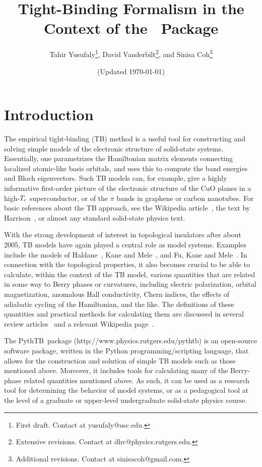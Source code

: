 \documentclass[11pt]{article}
\title{\Large Tight-Binding Formalism in the Context of the \PythTB\ Package}
\author{Tahir Yusufaly\footnote{First draft.  Contact at yusufaly@usc.edu.},
David Vanderbilt\footnote{Extensive revisions.  Contact at
dhv@physics.rutgers.edu.}, and
Sinisa Coh\footnote{Additional revisions.  Contact at
sinisacoh@gmail.com.}
}
\date{(Updated \today)}
\numberwithin{equation}{section} %
\def\PythTB{{\sc PythTB}}
\begin{document}
\maketitle

\section{Introduction}

The empirical tight-binding (TB) method is a useful tool for
constructing and solving simple models of the electronic structure
of solid-state systems.  Essentially, one parametrizes the
Hamiltonian matrix elements connecting localized atomic-like basis orbitals,
and uses this to compute the band energies and Bloch eigenvectors.
Such TB models can, for example, give a highly informative first-order
picture of the electronic structure of the CuO planes in a
high-$T_{\rm c}$ superconductor, or of the $\pi$ bands in
graphene or carbon nanotubes.  For basic references about the
TB approach, see the Wikipedia article~\cite{wiki-tb},
the text by Harrison~\cite{harrison-book},
or almost any standard solid-state physics text.

With the strong development of interest in topological insulators
after about 2005, TB models have again played a central role as
model systems.  Examples include the models of Haldane~\cite{haldane},
Kane and Mele~\cite{km}, and Fu, Kane and Mele~\cite{fkm}.
In connection with the topological properties, it also becomes
crucial to be able to calculate, within the context of the
TB model, various quantities that are related in some way to
Berry phases or curvatures, including electric polarization,
orbital magnetization, anomalous Hall conductivity, Chern
indices, the effects of adiabatic cycling of the Hamiltonian,
and the like.  The definitions of these quantities and practical
methods for calculating them are discussed in several review
articles~\cite{resta-rmp,vand-resta,xcn,resta-jpcm} and
a relevant Wikipedia page~\cite{wiki-berry}.

The \PythTB\ package (http://www.physics.rutgers.edu/pythtb)
is an open-source software package, written in
the Python programming/scripting language, that
allows for the construction and solution of simple TB models
such as those mentioned above.  Moreover, it includes tools
for calculating many of the Berry-phase related quantities mentioned
above.  As such, it can be used as a research tool for determining
the behavior of model systems, or as a pedagogical tool at the
level of a graduate or upper-level undergraduate solid-state
physics course.
\end{document}
